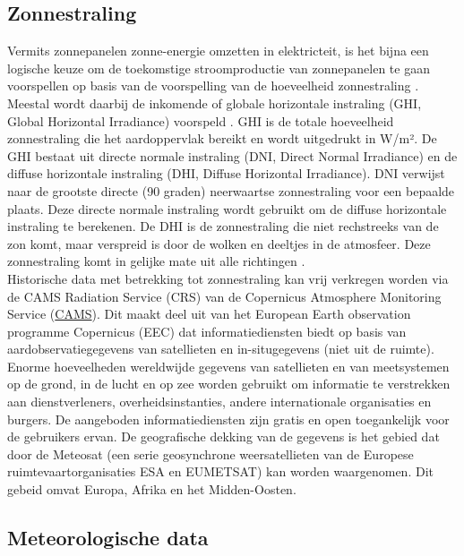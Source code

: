 \subsection{Zonnestraling}

Vermits zonnepanelen zonne-energie omzetten in elektricteit, is het bijna een logische keuze om de toekomstige stroomproductie van zonnepanelen te gaan voorspellen op basis van de voorspelling van de hoeveelheid zonnestraling \autocite{Ledmaoui2023}. Meestal wordt daarbij de inkomende of globale horizontale instraling (GHI, Global Horizontal Irradiance) voorspeld . GHI is de totale hoeveelheid zonnestraling die het aardoppervlak bereikt en wordt uitgedrukt in W/m². De GHI bestaat uit directe normale instraling (DNI, Direct Normal Irradiance)  en de diffuse horizontale instraling (DHI, Diffuse Horizontal Irradiance). DNI verwijst naar de grootste directe (90 graden) neerwaartse zonnestraling voor een bepaalde plaats. Deze directe normale instraling wordt gebruikt om de diffuse horizontale instraling te berekenen. De DHI is de zonnestraling die niet rechstreeks van de zon komt, maar verspreid is door de wolken en deeltjes in de atmosfeer. Deze zonnestraling komt in gelijke mate uit alle richtingen \autocite{Sehrawat2023}. \\

Historische data met betrekking tot zonnestraling kan vrij verkregen worden via de CAMS Radiation Service (CRS) van de Copernicus Atmosphere Monitoring Service (\href{https://atmosphere.copernicus.eu}{CAMS}). Dit maakt deel uit van het European Earth observation programme Copernicus (EEC) dat informatiediensten biedt op basis van aardobservatiegegevens van satellieten en in-situgegevens (niet uit de ruimte). Enorme hoeveelheden wereldwijde gegevens van satellieten en van meetsystemen op de grond, in de lucht en op zee worden gebruikt om informatie te verstrekken aan dienstverleners, overheidsinstanties, andere internationale organisaties en burgers. De aangeboden informatiediensten zijn gratis en open toegankelijk voor de gebruikers ervan. De geografische dekking van de gegevens is het gebied dat door de Meteosat (een serie geosynchrone weersatellieten van de Europese ruimtevaartorganisaties ESA en EUMETSAT) kan worden waargenomen. Dit gebeid omvat Europa, Afrika en het Midden-Oosten.

\subsection{Meteorologische data}

